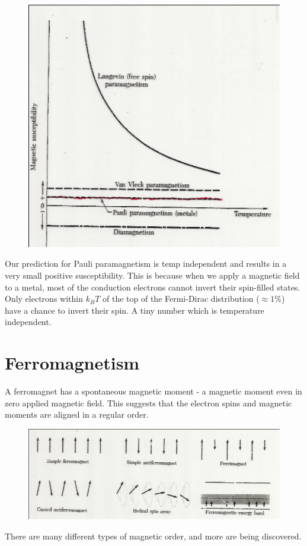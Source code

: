 \documentclass[a4paper, 11pt, normalem]{report}
\begin{document}
\begin{figure}[H]
    \centering
    \includegraphics[scale=0.5]{paulmag.png}
\end{figure}
Our prediction for Pauli paramagnetism is temp independent and results in a very small positive susceptibility. 
This is because when we apply a magnetic field to a metal, most of the conduction electrons cannot invert their spin-filled states. 
Only electrons within $k_BT$ of the top of the Fermi-Dirac distribution ($\approx 1\%$) have a chance to invert their spin.
A tiny number which is temperature independent.

\section{Ferromagnetism}
A ferromagnet has a spontaneous magnetic moment - a magnetic moment even in zero applied magnetic field. 
This suggests that the electron spins and magnetic moments are aligned in a regular order.
\begin{figure}[H]
    \centering
    \includegraphics[scale=0.5]{ferro.png}
\end{figure}
There are many different types of magnetic order, and more are being discovered.
\end{document}
